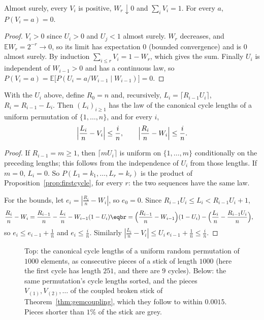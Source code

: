 \begin{lemma}\label{lem:gem}
Almost surely, every $V_i$ is positive, $W_r\downarrow0$ and $\sum_iV_i=1$. For every $a$, $P(V_i=a)=0$.
\end{lemma}
\begin{proof}
$V_i>0$ since $U_i>0$ and $U_j<1$ almost surely. $W_r$ decreases, and $\mathbb EW_r=2^{-r}\to0$, so its limit has expectation $0$ (bounded convergence) and is $0$ almost surely. By induction $\sum_{i\le r}V_i=1-W_r$, which gives the sum. Finally $U_i$ is independent of $W_{i-1}>0$
and has a continuous law, so $P(V_i=a)=\mathbb E\bigl[P(U_i=a/W_{i-1}\mid W_{i-1})\bigr]=0$.
\end{proof}

\begin{theorem}\label{thm:gemcoupling}
With the $U_i$ above, define $R_0=n$ and, recursively, $L_i=\lceil R_{i-1}U_i\rceil$, $R_i=R_{i-1}-L_i$. Then $(L_i)_{i\ge1}$ has the law of the canonical cycle lengths of a uniform permutation of $\{1,\dots,n\}$, and for every $i$,
\[
\Bigl|\frac{L_i}n-V_i\Bigr|\le\frac in,\qquad\Bigl|\frac{R_i}n-W_i\Bigr|\le\frac in.
\]
\end{theorem}
\begin{proof}
If $R_{i-1}=m\ge1$, then $\lceil mU_i\rceil$ is uniform on $\{1,\dots,m\}$ conditionally on the preceding lengths; this follows from the independence of $U_i$ from those lengths. If $m=0$, $L_i=0$. So $P(L_1=k_1,\dots,L_r=k_r)$ is the product of Proposition~\ref{prop:firstcycle}, for every $r$: the two sequences have the same law.

For the bounds, let $e_i=|\frac{R_i}n-W_i|$, so $e_0=0$. Since $R_{i-1}U_i\le L_i<R_{i-1}U_i+1$,
\[
\begin{aligned}\frac{R_i}n-W_i&=\frac{R_{i-1}}n-\frac{L_i}n-W_{i-1}(1-U_i)\eqbr=\Bigl(\frac{R_{i-1}}n-W_{i-1}\Bigr)(1-U_i)-\Bigl(\frac{L_i}n-\frac{R_{i-1}U_i}n\Bigr),\end{aligned}
\]
so $e_i\le e_{i-1}+\frac1n$ and $e_i\le\frac in$. Similarly $|\frac{L_i}n-V_i|\le U_i\,e_{i-1}+\frac1n\le\frac in$.
\end{proof}

\begin{figure}[ht]
\centering{}
\caption{Top: the canonical cycle lengths of a uniform random permutation of $1000$ elements, as consecutive pieces of a stick of length $1000$ (here the first cycle has length $251$, and there are $9$ cycles). Below: the same permutation's cycle lengths sorted, and the
pieces $V_{(1)},V_{(2)},\dots$ of the coupled broken stick of Theorem~\ref{thm:gemcoupling}, which they follow to within $0.0015$. Pieces shorter than $1\%$ of the stick are grey.}
\label{fig:sticks}
\end{figure}

